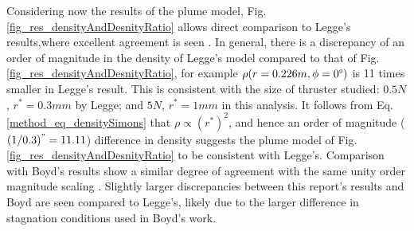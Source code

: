 \documentclass[journal]{new-aiaa}
\begin{document}





Considering now the results of the plume model, Fig. \ref{fig_res_densityAndDesnityRatio} allows direct comparison to Legge's results,where excellent agreement is seen  \cite{leggeModellingControlThruster1982}. In general, there is a discrepancy of an order of magnitude in the density of Legge's model compared to that of Fig. \ref{fig_res_densityAndDesnityRatio}, for example $\rho(r=0.226m, \phi=0\degree)$ is 11 times smaller in Legge's result. This is consistent with the size of thruster studied: $0.5N$, $r^* = 0.3mm$ by Legge; and $5N$, $r^*=1mm$ in this analysis. It follows from Eq. \ref{method_eq_densitySimons} that $\rho \propto (r^*)^2$, and hence an order of magnitude ($(1/0.3)^" = 11.11$) difference in density suggests the plume model of Fig. \ref{fig_res_densityAndDesnityRatio} to be consistent with Legge's. Comparison with Boyd's results show a similar degree of agreement with the same unity order magnitude scaling \cite{boydModelingSmallHydrazine1990}. Slightly larger discrepancies between this report's results and Boyd are seen compared to Legge's, likely due to the larger difference in stagnation conditions used in Boyd's work.



\end{document}
